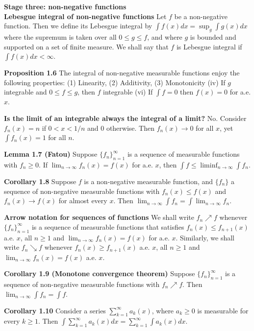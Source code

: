 \documentclass[6pt,landscape]{article}
\begin{document}
\begin{multicols*}{3}
\textbf{Stage three: non-negative functions}\\

\textbf{Lebesgue integral of non-negative functions} Let $f$ be a non-negative function. Then we define its Lebesgue integral by $\int f(x)dx = \sup_g \int g(x)dx$ where the supremum is taken
over all $0\leq g\leq f$, and where $g$ is bounded and supported on a set of finite measure. We shall say that $f$ is Lebesgue integral if $\int f(x)dx < \infty$.

\textbf{Proposition 1.6} The integral of non-negative measurable functions enjoy the following properties: (1) Linearity, (2) Additivity, (3) Monotonicity (iv) If $g$ integrable and $0\leq f\leq g$, then
$f$ integrable (vi) If $\int f = 0$ then $f(x)=0$ for a.e. $x$.

\textbf{Is the limit of an integrable always the integral of a limit?} No. Consider $f_n(x) = n$ if $0<x<1/n$ and 0 otherwise. Then $f_n(x)\to 0$ for all $x$, yet $\int f_n(x) = 1$ for all $n$.

\textbf{Lemma 1.7 (Fatou)} Suppose $\{f_n\}_{n=1}^{\infty}$ is a sequence of measurable functions with $f_n\geq 0$. If $\lim_{n\to\infty} f_n(x) = f(x)$ for a.e. $x$, then $\int f \leq \liminf_{n\to\infty} \int f_n$.

\textbf{Corollary 1.8} Suppose $f$ is a non-negative measurable function, and $\{f_n\}$ a sequence of non-negative measurable functions with $f_n(x)\leq f(x)$ and $f_n(x)\to f(x)$ for almost every $x$. Then
$\lim_{n\to\infty} \int f_n = \int \lim_{n\to\infty} f_n$.

\textbf{Arrow notation for sequences of functions} We shall write $f_n\nearrow f$ whenever $\{f_n\}_{n=1}^{\infty}$ is a sequence of measurable functions that satisfies $f_n(x)\leq f_{n+1}(x)$ a.e. $x$,
all $n\geq 1$ and $\lim_{n\to\infty} f_n(x) = f(x)$ for a.e. $x$. Similarly, we shall write $f_n\searrow f$ whenever $f_n(x)\geq f_{n+1}(x)$ a.e. $x$, all $n\geq 1$ and $\lim_{n\to\infty} f_n(x) = f(x)$ a.e. $x$.

\textbf{Corollary 1.9 (Monotone convergence theorem)} Suppose $\{f_n\}_{n=1}^{\infty}$ is a sequence of non-negative measurable functions with $f_n\nearrow f$. Then $\lim_{n\to\infty} \int f_n = \int f$.

\textbf{Corollary 1.10} Consider a series $\sum_{k=1}^{\infty} a_k(x)$, where $a_k\geq 0$ is measurable for every $k\geq 1$. Then $\int \sum_{k=1}^{\infty} a_k(x)dx = \sum_{k=1}^{\infty} \int a_k(x)dx$.\\


\end{multicols*}
\end{document}
